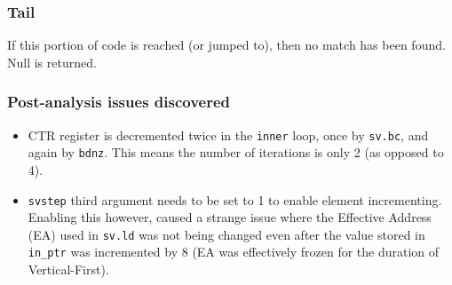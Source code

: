 \subsubsection{Tail}

If this portion of code is reached (or jumped to), then no
match has been found. Null is returned.

\subsubsection{Post-analysis issues discovered}

\begin{itemize}
  \item CTR register is decremented twice in the \texttt{inner} loop, once by
  \texttt{sv.bc}, and again by \texttt{bdnz}.
  This means the number of iterations is only 2 (as opposed to 4).
  \item \texttt{svstep} third argument needs to be set to 1 to enable
  element incrementing. Enabling this however, caused a strange issue where the
  Effective Address (EA) used in \texttt{sv.ld} was not being changed even
  after the value stored in \texttt{in\_ptr} was incremented by 8
  (EA was effectively frozen for the duration of Vertical-First).
\end{itemize}
